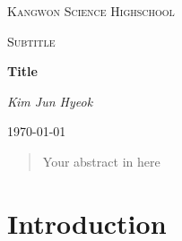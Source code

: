 \documentclass{article}
\begin{document}
    \begin{titlepage}
        \centering
	    {\scshape\LARGE Kangwon Science Highschool \par}
	    \vspace{1cm}
	    {\scshape\Large Subtitle\par}
        \vspace{1.5cm}
	    {\huge\bfseries Title\par}
	    \vspace{2cm}
	    {\Large\itshape Kim Jun Hyeok\par}
	    \vfill
	    {\large \today\par}
    \end{titlepage}
    \linespread{1.5}
    \begin{abstract}
	Your abstract in here
    \end{abstract}
    \tableofcontents
    \newpage
    \section[도입]{Introduction}
\end{document}
